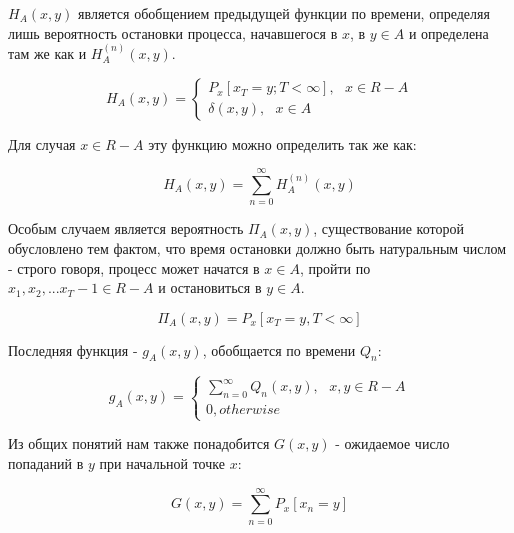 $H_A(x,y)$ является обобщением предыдущей функции по времени, определяя лишь вероятность остановки процесса, начавшегося в $x$, в $y \in A$ и определена там же как и $H^{(n)}_A(x,y)$.

\begin{equation}
H_A(x,y) = 
	\begin{cases}
		P_x[x_T=y; T < \infty], \ \ \ x \in R-A \\
		\delta(x,y), \ \ \ x \in A
	\end{cases}
\end{equation}

Для случая $x \in R-A$ эту функцию можно определить так же как:

\begin{equation}
H_A(x,y) = \sum^{\infty}_{n=0}H^{(n)}_A(x,y)
\end{equation}

Особым случаем является вероятность $\Pi_A(x,y)$, существование которой обусловлено тем фактом, что время остановки должно быть натуральным числом - строго говоря, процесс может начатся в $x \in A$, пройти по ${x_1, x_2,...x_T-1 \in R-A}$ и остановиться в $y \in A$.

\begin{equation}
\Pi_{A}(x,y) = P_x[x_T=y, T < \infty]
\end{equation}

Последняя функция - $g_A(x,y)$, обобщается по времени $Q_n$:

\begin{equation}
g_A(x,y) = 
	\begin{cases}
		\sum^{\infty}_{n=0}Q_n(x,y), \ \ \ x, y \in R-A \\
		0, otherwise
	\end{cases}
\end{equation}

Из общих понятий нам также понадобится $G(x,y)$ - ожидаемое число попаданий в $y$ при начальной точке $x$:

\begin{equation}
G(x,y) = \sum_{n=0}^{\infty}P_x[x_n=y]
\end{equation}


